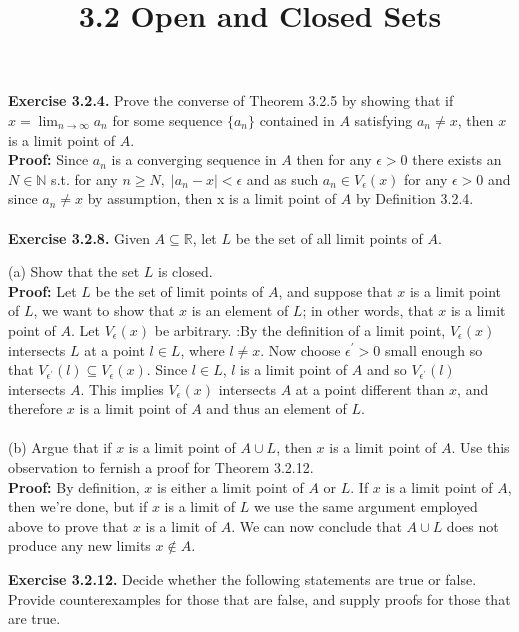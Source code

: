 \documentclass{article}
\title{\textbf{3.2 Open and Closed Sets}}
\begin{document}
\maketitle
\textbf{Exercise 3.2.4.} Prove the converse of Theorem 3.2.5 by showing that if $x = \lim_{n \to \infty}a_n$ for some sequence $\{ a_n \}$ contained in $A$ satisfying $a_n \neq x$, then $x$ is a limit point of $A$.  \\
\textbf{Proof:} Since $a_n$ is a converging sequence in $A$ then for any $\epsilon > 0$ there exists an $N \in \mathbb{N}$ s.t. for any $n \geq N, \; |a_n - x| < \epsilon$ and as such $a_n \in V_\epsilon(x)$ for any $\epsilon > 0$ and since $a_n \neq x$ by assumption, then x is a limit point of $A$ by Definition 3.2.4. \\ \\
\textbf{Exercise 3.2.8.} Given $A \subseteq \mathbb{R}$, let $L$ be the set of all limit points of $A$.
\begin{itemize}
	(a) Show that the set $L$ is closed. \\
	\textbf{Proof:} Let $L$ be the set of limit points of $A$, and suppose that $x$ is a limit point of $L$, we want to show that $x$ is an element of $L$; in other words, that $x$ is a limit point of $A$. Let $V_\epsilon(x)$ be arbitrary. :By the definition of a limit point, $V_\epsilon(x)$ intersects $L$ at a point $l \in L$, where $l \neq x$. Now choose $\epsilon^{'} > 0$ small enough so that $V_{\epsilon^{'}}(l) \subseteq V_\epsilon(x)$. Since $l \in L$, $l$ is a limit point of $A$ and so $V_{\epsilon^{'}}(l)$ intersects $A$. This implies $V_\epsilon(x)$ intersects $A$ at a point different than $x$, and therefore $x$ is a limit point of $A$ and thus an element of $L$.\\ \\
	(b) Argue that if $x$ is a limit point of $A \cup L$, then $x$ is a limit point of $A$. Use this observation to fernish a proof for Theorem 3.2.12. \\
	\textbf{Proof:} By definition, $x$ is either a limit point of $A$ or $L$. If $x$ is a limit point of $A$, then we're done, but if $x$ is a limit of $L$ we use the same argument employed above to prove that $x$ is a limit of $A$. We can now conclude that $A \cup L$ does not produce any new limits $x \notin A$. \\
\end{itemize}
\textbf{Exercise 3.2.12.} Decide whether the following statements are true or false. \\
Provide counterexamples for those that are false, and supply proofs for those that are true. \\
\end{document}
